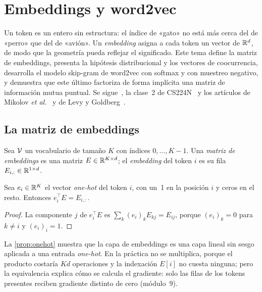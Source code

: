 \chapter{Embeddings y word2vec}
\label{tema:4}

Un token es un entero sin estructura: el índice de «gato» no está más cerca del de «perro» que del de «avión». Un \emph{embedding} asigna a cada token un vector de $\mathbb{R}^{d}$, de modo que la geometría pueda reflejar el significado. Este tema define la matriz de embeddings, presenta la hipótesis distribucional y los vectores de coocurrencia, desarrolla el modelo skip-gram de word2vec con softmax y con muestreo negativo, y demuestra que este último factoriza de forma implícita una matriz de información mutua puntual. Se sigue~\cite[§5.2--5.5]{jm3}, la clase~2 de CS224N~\cite{cs224n} y los artículos de Mikolov \emph{et al.}~\cite{mikolov13a,mikolov13b} y de Levy y Goldberg~\cite{levy}.

\section{La matriz de embeddings}

\begin{definicion}\label{def:embedding}
Sea $\mathcal{V}$ un vocabulario de tamaño $K$ con índices $0,\dots,K-1$. Una \emph{matriz de embeddings} es una matriz $E\in\mathbb{R}^{K\times d}$; el \emph{embedding} del token $i$ es su fila $E_{i,:}\in\mathbb{R}^{1\times d}$.
\end{definicion}

\begin{proposicion}\label{prop:onehot}
Sea $e_i\in\mathbb{R}^{K}$ el vector \emph{one-hot} del token $i$, con un~1 en la posición $i$ y ceros en el resto. Entonces $e_i^{\top}E=E_{i,:}$.
\end{proposicion}

\begin{proof}
La componente $j$ de $e_i^{\top}E$ es $\sum_{k}(e_i)_k E_{kj}=E_{ij}$, porque $(e_i)_k=0$ para $k\neq i$ y $(e_i)_i=1$.
\end{proof}

La \cref{prop:onehot} muestra que la capa de embeddings es una capa lineal sin sesgo aplicada a una entrada \emph{one-hot}. En la práctica no se multiplica, porque el producto costaría $Kd$ operaciones y la indexación $E[i]$ no cuesta ninguna; pero la equivalencia explica cómo se calcula el gradiente: solo las filas de los tokens presentes reciben gradiente distinto de cero (módulo~9).

